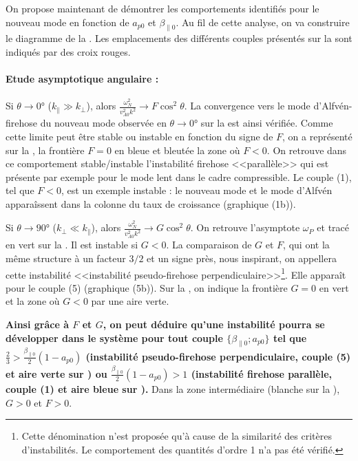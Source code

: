 On propose maintenant de démontrer les comportements identifiés pour le nouveau mode en fonction de $a_{p0}$ et $\beta_{\parallel 0}$. Au fil de cette analyse, on va construire le diagramme de la . Les emplacements des différents couples présentés sur la  sont indiqués par des croix rouges. 

\paragraph{Etude asymptotique angulaire : }Si $\theta \rightarrow \ang{0}$ ($k_{\parallel}\gg k_{\perp}$), alors $\frac{\omega^2_N}{v^2_{A0}k^2} \rightarrow F \cos^2 \theta$. La convergence vers le mode d'Alfvén-firehose du nouveau mode observée en $\theta \rightarrow \ang{0}$ sur la  est ainsi vérifiée. Comme cette limite peut être stable ou instable en fonction du signe de $F$, on a représenté sur la , la frontière $F=0$ en bleue et bleutée la zone où $F<0$. On retrouve dans ce comportement stable/instable l'instabilité firehose <<parallèle>> qui est présente par exemple pour le mode lent dans le cadre compressible. Le couple (1), tel que $F<0$, est un exemple instable : le nouveau mode et le mode d'Alfvén apparaîssent dans la colonne du taux de croissance (graphique (1b)). 

Si $\theta \rightarrow \ang{90}$ ($k_{\perp}\ll k_{\parallel} $), alors $\frac{\omega^2_N}{v^2_{A0}k^2} \rightarrow G \cos^2 \theta$. On retrouve l'asymptote $\omega_P$ et tracé en vert sur la . Il est instable si $G<0$. La comparaison de $G$ et $F$, qui ont la même structure à un facteur $3/2$ et un signe près, nous inspirant, on appellera cette instabilité <<instabilité pseudo-firehose perpendiculaire>>\footnote{Cette dénomination n'est proposée qu'à cause de la similarité des critères d'instabilités. Le comportement des quantités d'ordre 1 n'a pas été vérifié.}. Elle apparaît pour le couple (5) (graphique (5b)). Sur la , on indique la frontière $G=0$ en vert et la zone où $G<0$ par une aire verte. 

{\bf Ainsi grâce à $F$ et $G$, on peut déduire qu'une instabilité pourra se développer dans le système pour tout couple $\{\beta_{\parallel 0};a_{p0}\}$ tel que $\frac{2}{3}>\frac{\beta_{\parallel 0}}{2}(1-a_{p0})$ (instabilité pseudo-firehose perpendiculaire, couple (5) et aire verte sur ) ou $\frac{\beta_{\parallel 0}}{2}(1-a_{p0})>1$ (instabilité firehose parallèle, couple (1) et aire bleue sur ).} Dans la zone intermédiaire (blanche sur la ), $G>0$ et $F>0$. 

